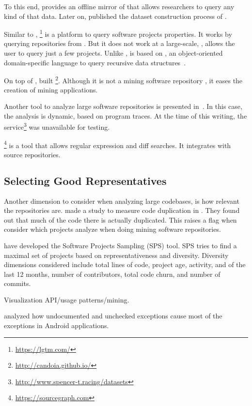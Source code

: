 To this end, \cite{gousios_ghtorent_2013} provides an offline mirror of \github{} that allows researchers to query any kind of that data. 
Later on, \cite{gousios_lean_2014} published the dataset construction process of \github{}. 

Similar to \boa{}, \lgtm \footnote{\url{https://lgtm.com/}} is a platform to query software projects properties. 
It works by querying repositories from \github{}. 
But it does not work at a large-scale, \ie{}, \lgtm{} allows the user to query just a few projects. 
Unlike \boa{}, \lgtm{} is based on \ql{}, an object-oriented domain-specific language to query recursive data structures~\cite{avgustinov_ql:_2016}. 

On top of \boa{}, \cite{tiwari_candoia:_2017} built \candoia \footnote{\url{http://candoia.github.io/}}. 
Although it is not a mining software repository \perse{}, it eases the creation of mining applications. 

Another tool to analyze large software repositories is presented in~\cite{brandauer_spencer:_2017}. 
In this case, the analysis is dynamic, based on program traces. 
At the time of this writing, the service\footnote{\url{http://www.spencer-t.racing/datasets}} was unavailable for testing. 

\sourcegraph \footnote{\url{https://sourcegraph.com}} is a tool that allows regular expression and diff searches.
It integrates with source repositories.

\subsection{Selecting Good Representatives} \label{sec:rw:selection}

Another dimension to consider when analyzing large codebases, is how relevant the repositories are. 
\cite{lopes_dejavu:_2017} made a study to measure code duplication in \github{}. 
They found out that much of the code there is actually duplicated. 
This raises a flag when consider which projects analyze when doing mining software repositories. 

\cite{nagappan_diversity_2013} have developed the Software Projects Sampling (SPS) tool. 
SPS tries to find a maximal set of projects based on representativeness and diversity. 
Diversity dimensions considered include total lines of code, project age, activity, and of the last 12 months, number of contributors, total code churn, and number of commits.

\cite{saied_visualization_2015} Visualization API/usage
patterns/mining.

\cite{kechagia_undocumented_2014} analyzed how undocumented and
unchecked exceptions cause most of the exceptions in
Android applications.
